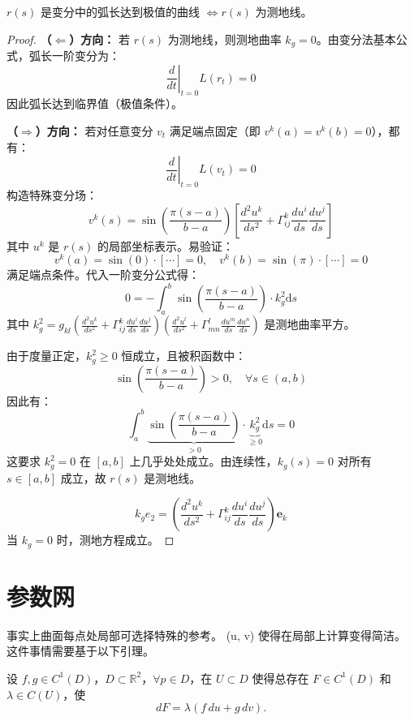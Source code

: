 \documentclass[lang=cn,10pt,thmcnt=section]{elegantbook}
\newcommand{\dd}{\mathrm{d}}
\renewcommand{\vec}[1]{\mathbf{#1}}
\begin{document}
\begin{theorem}
    \( r(s) \) 是变分中的弧长达到极值的曲线 \(\Leftrightarrow r(s)\) 为测地线。
\end{theorem}
\begin{proof}
    \textbf{（\(\Leftarrow\)）方向：} 若 \( r(s) \) 为测地线，则测地曲率 \( k_g = 0 \)。由变分法基本公式，弧长一阶变分为：
    \[
    \left. \frac{d}{dt} \right|_{t=0} L(r_t) = 0
    \]
    因此弧长达到临界值（极值条件）。
    
    \textbf{（\(\Rightarrow\)）方向：} 若对任意变分 \( v_t \) 满足端点固定（即 \( v^k(a) = v^k(b) = 0 \)），都有：
    \[
    \left. \frac{d}{dt} \right|_{t=0} L(v_t) = 0
    \]
    构造特殊变分场：
    \[
    v^k(s) = \sin \left( \frac{\pi (s - a)}{b - a} \right) \left[ \frac{d^2 u^k}{ds^2} + \Gamma_{ij}^k \frac{du^i}{ds} \frac{du^j}{ds} \right]
    \]
    其中 \( u^k \) 是 \( r(s) \) 的局部坐标表示。易验证：
    \[
    v^k(a) = \sin(0) \cdot [\cdots] = 0, \quad v^k(b) = \sin(\pi) \cdot [\cdots] = 0
    \]
    满足端点条件。代入一阶变分公式得：
    \[
    0 = -\int_a^b \sin \left( \frac{\pi (s - a)}{b - a} \right) \cdot k_g^2  \dd s
    \]
    其中 \( k_g^2 = g_{kl} \left( \frac{d^2 u^k}{ds^2} + \Gamma_{ij}^k \frac{du^i}{ds} \frac{du^j}{ds} \right) \left( \frac{d^2 u^l}{ds^2} + \Gamma_{mn}^l \frac{du^m}{ds} \frac{du^n}{ds} \right) \) 是测地曲率平方。
    
    由于度量正定，\( k_g^2 \geq 0 \) 恒成立，且被积函数中：
    \[
    \sin \left( \frac{\pi (s - a)}{b - a} \right) > 0, \quad \forall s \in (a,b)
    \]
    因此有：
    \[
    \int_a^b \underbrace{\sin \left( \frac{\pi (s - a)}{b - a} \right)}_{>0} \cdot \underbrace{k_g^2}_{\geq 0}  \dd s = 0
    \]
    这要求 \( k_g^2 = 0 \) 在 \([a,b]\) 上几乎处处成立。由连续性，\( k_g(s) = 0 \) 对所有 \( s \in [a,b] \) 成立，故 \( r(s) \) 是测地线。
    
   
    \[
    k_g e_2 = \left( \frac{d^2 u^k}{ds^2} + \Gamma_{ij}^k \frac{du^i}{ds} \frac{du^j}{ds} \right) \vec{e}_k
    \]
    当 \( k_g = 0 \) 时，测地方程成立。
\end{proof}

\section{参数网}
事实上曲面每点处局部可选择特殊的参考。
(u, v) 使得在局部上计算变得简洁。
这件事情需要基于以下引理。

\begin{lemma}
    设 $f, g \in C^1(D)$，$D \subset \mathbb{R}^2$，$\forall p \in D$，在 $U \subset D$ 使得总存在 $F \in C^1(D)$ 和 $\lambda \in C(U)$，使
\[
dF = \lambda (f \, du + g \, dv).
\]
\end{lemma}
\end{document}
